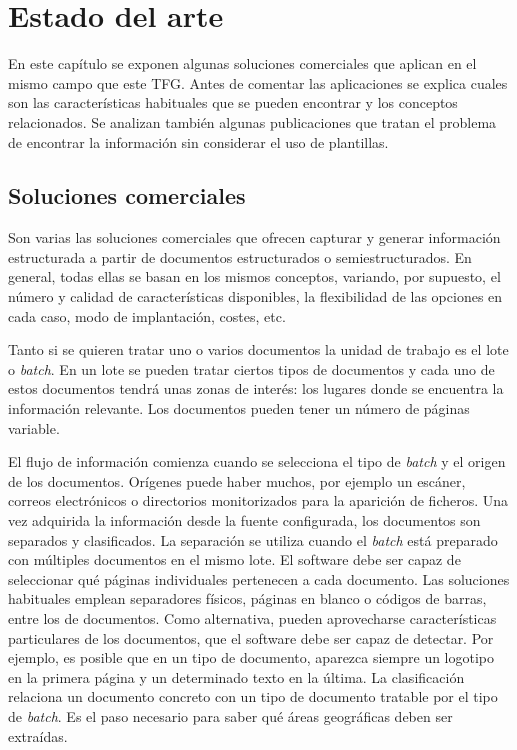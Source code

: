 
\chapter{Estado del arte}
\label{chap:estado-arte}

En este capítulo se exponen algunas soluciones comerciales que aplican en el mismo campo que este TFG. Antes de comentar las aplicaciones se explica cuales son las características habituales que se pueden encontrar y los conceptos relacionados. Se analizan también algunas publicaciones que tratan el problema de encontrar la información sin considerar el uso de plantillas.

\section{Soluciones comerciales}

Son varias las soluciones comerciales que ofrecen capturar y generar información estructurada a partir de documentos estructurados o semiestructurados. En general, todas ellas se basan en los mismos conceptos, variando, por supuesto, el número y calidad de características disponibles, la flexibilidad de las opciones en cada caso, modo de implantación, costes, etc.

Tanto si se quieren tratar uno o varios documentos la unidad de trabajo es el lote o \emph{batch}. En un lote se pueden tratar ciertos tipos de documentos y cada uno de estos documentos tendrá unas zonas de interés: los lugares donde se encuentra la información relevante. Los documentos pueden tener un número de páginas variable.

El flujo de información comienza cuando se selecciona el tipo de \emph{batch} y el origen de los documentos. Orígenes puede haber muchos, por ejemplo un escáner, correos electrónicos o directorios monitorizados para la aparición de ficheros. Una vez adquirida la información desde la fuente configurada, los documentos son separados y clasificados. La separación se utiliza cuando el \emph{batch} está preparado con múltiples documentos en el mismo lote. El software debe ser capaz de seleccionar qué páginas individuales pertenecen a cada documento. Las soluciones habituales emplean separadores físicos, páginas en blanco o códigos de barras, entre los de documentos. Como alternativa, pueden aprovecharse características particulares de los documentos, que el software debe ser capaz de detectar. Por ejemplo, es posible que en un tipo de documento, aparezca siempre un logotipo en la primera página y un determinado texto en la última. La clasificación relaciona un documento concreto con un tipo de documento tratable por el tipo de \emph{batch}. Es el paso necesario para saber qué áreas geográficas deben ser extraídas.

